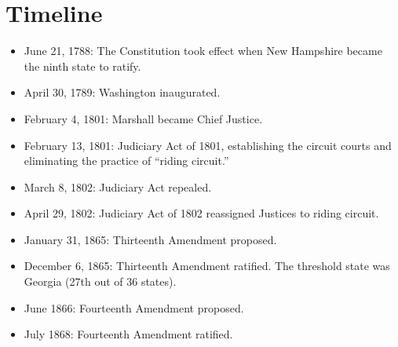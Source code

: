 \section{Timeline}

\begin{itemize}
    \item June 21, 1788: The Constitution took effect when New Hampshire 
    became the ninth state to ratify.
    \item April 30, 1789: Washington inaugurated.
    \item February 4, 1801: Marshall became Chief Justice.
    \item February 13, 1801: Judiciary Act of 1801, establishing the circuit 
    courts and eliminating the practice of ``riding circuit.''
    \item March 8, 1802: Judiciary Act repealed.
    \item April 29, 1802: Judiciary Act of 1802 reassigned Justices to riding 
    circuit.
    \item January 31, 1865: Thirteenth Amendment proposed.
    \item December 6, 1865: Thirteenth Amendment ratified. The threshold state 
    was Georgia (27th out of 36 states).
    \item June 1866: Fourteenth Amendment proposed.
    \item July 1868: Fourteenth Amendment ratified.
\end{itemize}
